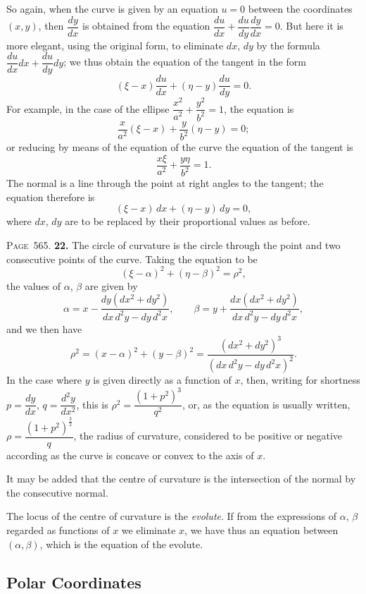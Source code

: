 \documentclass[11pt,a4paper]{book}
\begin{document}
So again, when the curve is given by an equation $u=0$ between the coordinates $(x,y)$, then $\dfrac{dy}{dx}$ is obtained from the equation $\dfrac{du}{dx}+\dfrac{du}{dy}\dfrac{dy}{dx}=0$. But here it is more elegant, using the original form, to eliminate $dx$, $dy$ by the formula $\dfrac{du}{dx}dx+\dfrac{du}{dy}dy$; we thus obtain the equation of the tangent in the form
\[
(\xi-x)\frac{du}{dx}+(\eta-y)\frac{du}{dy}=0.
\]
For example, in the case of the ellipse $\dfrac{x^2}{a^2}+\dfrac{y^2}{b^2}=1$, the equation is
\[
\frac{x}{a^2}(\xi-x)+\frac{y}{b^2}(\eta-y)=0;
\]
or reducing by means of the equation of the curve the equation of the tangent is
\[
\frac{x\xi}{a^2}+\frac{y\eta}{b^2}=1.
\]
The normal is a line through the point at right angles to the tangent; the equation therefore is
\[
(\xi-x)\,dx+(\eta-y)\,dy=0,
\]
where $dx$, $dy$ are to be replaced by their proportional values as before.

\newpage
\noindent\textsc{Page~565.} \textbf{22.} The circle of curvature is the circle through the point and two consecutive points of the curve. Taking the equation to be
\[
(\xi-\alpha)^2+(\eta-\beta)^2=\rho^2,
\]
the values of $\alpha$, $\beta$ are given by
\[
\alpha=x-\frac{dy(d\!x^2+dy^2)}{dx\,d^2y-dy\,d^2x},\qquad
\beta=y+\frac{dx(d\!x^2+dy^2)}{dx\,d^2y-dy\,d^2x},
\]
and we then have
\[
\rho^2=(x-\alpha)^2+(y-\beta)^2=\frac{(d\!x^2+dy^2)^3}{(dx\,d^2y-dy\,d^2x)^2}.
\]
In the case where $y$ is given directly as a function of $x$, then, writing for shortness $p=\dfrac{dy}{dx}$, $q=\dfrac{d^2y}{dx^2}$, this is $\rho^2=\dfrac{(1+p^2)^3}{q^2}$, or, as the equation is usually written, $\rho=\dfrac{(1+p^2)^{\frac32}}{q}$, the radius of curvature, considered to be positive or negative according as the curve is concave or convex to the axis of $x$.

It may be added that the centre of curvature is the intersection of the normal by the consecutive normal.

The locus of the centre of curvature is the \textit{evolute}. If from the expressions of $\alpha$, $\beta$ regarded as functions of $x$ we eliminate $x$, we have thus an equation between $(\alpha,\beta)$, which is the equation of the evolute.

\subsection*{Polar Coordinates}
\end{document}
